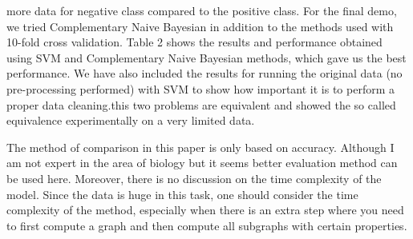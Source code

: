 \documentclass[letterpaper, 12pt]{article}
\begin{document}
       
more data for negative class compared to the positive class.
For the final demo, we tried Complementary Naive Bayesian in addition to the methods used with 10-fold cross validation. Table 2 shows the results and performance obtained using SVM and Complementary Naive Bayesian methods, which gave us the best performance. We have also included the results for running the original data (no pre-processing performed) with SVM
to show how important it is to perform a proper data cleaning.this two problems are equivalent and showed the so called equivalence experimentally on a very limited data.  


 \vspace*{10pt}



The method of comparison in this paper is only based on accuracy. Although I am not expert in the area of biology but it seems better evaluation method can be used here. Moreover,  there is no discussion on the time complexity of the model. Since the data is huge in this task, one should consider the time complexity of the method, especially when there is an extra step where you need to first compute a graph and then compute all subgraphs with certain properties. 
\end{document}
